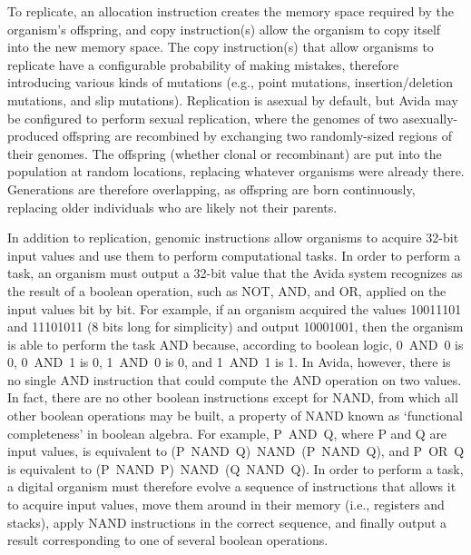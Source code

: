\documentclass[11pt]{article}
\begin{document}
To replicate, an allocation instruction creates the memory space
required by the organism's offspring, and copy instruction(s)
allow the organism to copy itself into the new memory space.
%
The copy instruction(s) that allow organisms to replicate
have a configurable probability of making mistakes,
therefore introducing various kinds of mutations
(e.g., point mutations, insertion/deletion mutations, and slip mutations).
%
Replication is asexual by default, but Avida may be configured to perform
sexual replication, where the genomes of two asexually-produced offspring
are recombined by exchanging two randomly-sized regions of their genomes.
%
The offspring (whether clonal or recombinant) are put into the population
at random locations, replacing whatever organisms were already there.
%
Generations are therefore overlapping, as offspring are born continuously,
replacing older individuals who are likely not their parents.



In addition to replication, genomic instructions allow organisms
to acquire 32-bit input values and use them to perform computational tasks.
%
In order to perform a task, an organism must output a 32-bit value
that the Avida system recognizes as the result of a boolean operation,
such as NOT, AND, and OR, applied on the input values bit by bit.
%
For example, if an organism acquired the values 10011101 and 11101011
(8 bits long for simplicity) and output 10001001,
then the organism is able to perform the task AND because,
according to boolean logic, 0~AND~0 is 0, 0~AND~1 is 0,
1~AND~0 is 0, and 1~AND~1 is 1.
%
In Avida, however, there is no single AND instruction
that could compute the AND operation on two values.
%
In fact, there are no other boolean instructions except for NAND,
from which all other boolean operations may be built,
a property of NAND known as `functional completeness' in boolean algebra.
%
For example, P~AND~Q, where P and Q are input values,
is equivalent to (P~NAND~Q)~NAND~(P~NAND~Q),
and P~OR~Q is equivalent to (P~NAND~P)~NAND~(Q~NAND~Q).
%
In order to perform a task, a digital organism must therefore evolve
a sequence of instructions that allows it to acquire input values,
move them around in their memory (i.e., registers and stacks),
apply NAND instructions in the correct sequence, and
finally output a result corresponding to one of several boolean operations.
\end{document}
